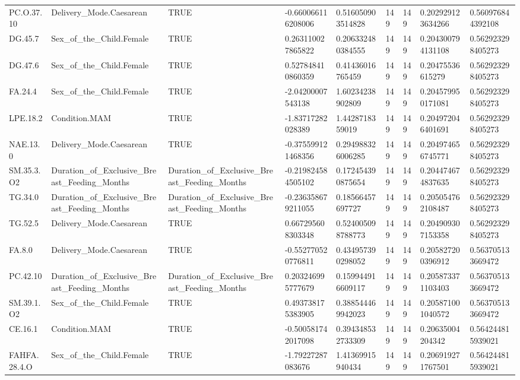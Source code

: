\begin{longtable}{lllllllll}
PC.O.37.10 & Delivery\_Mode.Caesarean & TRUE & -0.660066116208006 & 0.516050903514828 & 149 & 149 & 0.202929123634266 & 0.560976844392108 \\
DG.45.7 & Sex\_of\_the\_Child.Female & TRUE & 0.263110027865822 & 0.206332480384555 & 149 & 149 & 0.204300794131108 & 0.562923298405273 \\
DG.47.6 & Sex\_of\_the\_Child.Female & TRUE & 0.527848410860359 & 0.41436016765459 & 149 & 149 & 0.20475536615279 & 0.562923298405273 \\
FA.24.4 & Sex\_of\_the\_Child.Female & TRUE & -2.04200007543138 & 1.60234238902809 & 149 & 149 & 0.204579950171081 & 0.562923298405273 \\
LPE.18.2 & Condition.MAM & TRUE & -1.83717282028389 & 1.4428718359019 & 149 & 149 & 0.204972046401691 & 0.562923298405273 \\
NAE.13.0 & Delivery\_Mode.Caesarean & TRUE & -0.375599121468356 & 0.294988326006285 & 149 & 149 & 0.204974656745771 & 0.562923298405273 \\
SM.35.3.O2 & Duration\_of\_Exclusive\_Breast\_Feeding\_Months & Duration\_of\_Exclusive\_Breast\_Feeding\_Months & -0.219824584505102 & 0.172454390875654 & 149 & 149 & 0.204474674837635 & 0.562923298405273 \\
TG.34.0 & Duration\_of\_Exclusive\_Breast\_Feeding\_Months & Duration\_of\_Exclusive\_Breast\_Feeding\_Months & -0.236358679211055 & 0.18566457697727 & 149 & 149 & 0.205054762108487 & 0.562923298405273 \\
TG.52.5 & Delivery\_Mode.Caesarean & TRUE & 0.667295608303348 & 0.524005098788773 & 149 & 149 & 0.204909307153358 & 0.562923298405273 \\
FA.8.0 & Delivery\_Mode.Caesarean & TRUE & -0.552770520776811 & 0.434957390298052 & 149 & 149 & 0.205827200396912 & 0.563705133669472 \\
PC.42.10 & Duration\_of\_Exclusive\_Breast\_Feeding\_Months & Duration\_of\_Exclusive\_Breast\_Feeding\_Months & 0.203246995777679 & 0.159944916609117 & 149 & 149 & 0.205873371103403 & 0.563705133669472 \\
SM.39.1.O2 & Sex\_of\_the\_Child.Female & TRUE & 0.493738175383905 & 0.388544469942023 & 149 & 149 & 0.205871001040572 & 0.563705133669472 \\
CE.16.1 & Condition.MAM & TRUE & -0.500581742017098 & 0.394348532733309 & 149 & 149 & 0.20635004204342 & 0.564244815939021 \\
FAHFA.28.4.O & Sex\_of\_the\_Child.Female & TRUE & -1.79227287083676 & 1.41369915940434 & 149 & 149 & 0.206919271767501 & 0.564244815939021 \\

\end{longtable}

